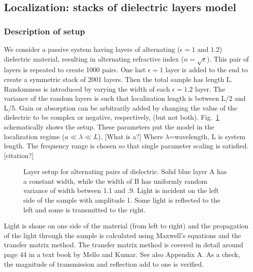 \subsection {Localization: stacks of dielectric layers model}

\subsubsection{Description of setup}

We consider a passive system having layers of alternating ($\epsilon = 1$ and $1.2$) dielectric material, resulting in alternating refractive index ($n = \sqrt{\epsilon}$). This pair of layers is repeated to create 1000 pairs. One last $\epsilon = 1$ layer is added to the end to create a symmetric stack of 2001 layers. Then the total sample has length L. Randomness is introduced by varying the width of each $\epsilon=1.2$ layer. The variance of the random layers is such that localization length is between L/2 and L/5. Gain or absorption can be arbitrarily added by changing the value of the dielectric to be complex or negative, respectively, (but not both). Fig.~\ref{fig:dimaSetup} schematically shows the setup. These parameters put the model in the localization regime ($a\ll\lambda\ll L$). [What is a?] Where $\lambda$=wavelength, L is system length. The frequency range is chosen so that single parameter scaling is satisfied. [citation?]

\begin{figure}
\vskip -0.5cm
\vskip -0.5cm
\caption{Layer setup for alternating pairs of dielectric. %
Solid blue layer A has a constant width, while the width of B has uniformly random variance of width between 1.1 and .9.  Light is incident on the left side of the sample with amplitude 1. Some light is reflected to the left and some is transmitted to the right.}
\label{fig:dimaSetup}
\end{figure}

Light is shone on one side of the material (from left to right) and the propagation of the light through the sample is calculated using Maxwell's equations and the transfer matrix method. The transfer matrix method is covered in detail around page 44 in a text book by Mello and Kumar\cite{2004_Mello_Kumar_book}. See also Appendix A.
As a check, the magnitude of transmission and reflection add to one is verified.


